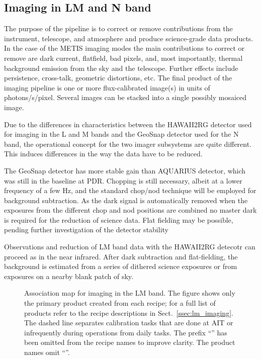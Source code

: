 \subsection{Imaging in LM and N band}
\label{ssec:overview_imaging}

The purpose of the pipeline is to correct or remove contributions from
the instrument, telescope, and atmosphere and produce science-grade
data products.  In the case of the METIS imaging modes the main
contributions to correct or remove are dark current, flatfield, bad
pixels, and, most importantly, thermal background emission from the
sky and the telescope. Further effects include persistence,
cross-talk, geometric distortions, etc. The final product of the
imaging pipeline is one or more flux-calibrated image(s) in units of
photons/s/pixel. Several images can be stacked into a single possibly
mosaiced image.

Due to the differences in characteristics between the HAWAII2RG
detector used for imaging in the L and M bands and the GeoSnap
detector used for the N band, the operational concept for the two
imager subsystems are quite different. This induces differences in the
way the data have to be reduced.

The GeoSnap detector has more stable gain than AQUARIUS detector,
which was still in the baseline at PDR.  Chopping is still necessary,
albeit at a lower frequency of a few Hz, and the standard chop/nod
technique will be employed for background subtraction.  As the dark
signal is automatically removed when the exposures from the different
chop and nod positions are combined no master dark is required for the
reduction of science data. Flat fielding may be possible, pending
further investigation of the detector stability

Observations and reduction of LM band data with the HAWAII2RG detecotr
can proceed as in the near infrared. After dark subtraction and
flat-fielding, the background is estimated from a series of dithered
science exposures or from exposures on a nearby blank patch of sky.



\begin{sidewaysfigure}
  \centering
  \centerline{}
  \caption[Reduction cascade and association map for imaing in L and
  M]{Association map for imaging in the LM band. The figure shows only
  the primary product created from each recipe; for a full list of
  products refer to the recipe descriptions in
  Sect.~\ref{ssec:lm_imaging}. The dashed line separates calibration
  tasks that are done at AIT or infrequently during operations from
  daily tasks. The prefix ``'' has been omitted from the
  recipe names to improve clarity. The product names omit
  ``''.}
  \label{fig:IMG_LM_Assomap}
\end{sidewaysfigure}


